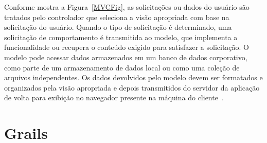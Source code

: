 \vspace{0.2cm}

\noindent  Conforme mostra a  Figura~\ref{MVCFig}, as  solicitações ou  dados do
usuário são tratados pelo controlador  que seleciona a visão apropriada com base
na  solicitação do usuário.   Quando o  tipo de  solicitação é  determinado, uma
solicitação  de  comportamento  é   transmitida  ao  modelo,  que  implementa  a
funcionalidade ou recupera  o conteúdo exigido para satisfazer  a solicitação. O
modelo pode  acessar dados  armazenados em um  banco de dados  corporativo, como
parte  de um  armazenamento  de dados  local  ou como  uma  coleção de  arquivos
independentes.   Os  dados  devolvidos   pelo  modelo  devem  ser  formatados  e
organizados pela visão apropriada e depois transmitidos do servidor da aplicação
de    volta   para   exibição    no   navegador    presente   na    máquina   do
cliente~\cite{Pressman11}. 

\section{Grails}

\vspace{0.3cm}

